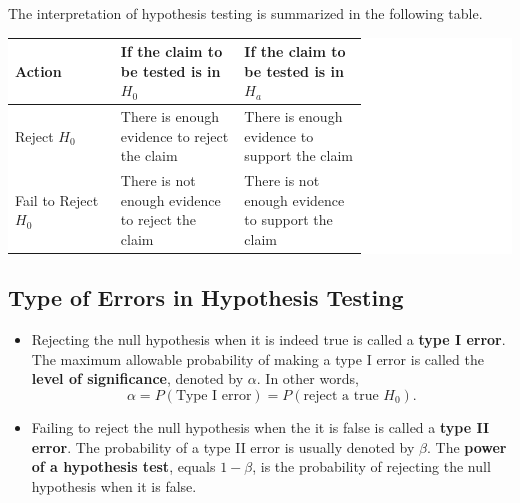 The interpretation of hypothesis testing is summarized in the following
table.

\begin{fullwidth}
  \colorbox{white}{
\parbox{\linewidth}{\centering
\begin{tabular}{l|p{0.35\linewidth}p{0.35\linewidth}}
  Action & If the claim to be tested is in \(H_0\) & If the claim to be tested is in \(H_a\) \\
  \midrule
  Reject \(H_0\) & There is enough evidence to reject the claim
  & There is enough evidence to support the claim \\
  Fail to Reject \(H_0\) & There is not enough evidence to reject the claim & There is not enough evidence to support the claim
\end{tabular}
}
  }
\end{fullwidth}

\hypertarget{type-of-errors-in-hypothesis-testing}{%
\subsection{Type of Errors in Hypothesis
Testing}\label{type-of-errors-in-hypothesis-testing}}

\begin{itemize}
\item
  Rejecting the null hypothesis when it is indeed true is called a
  \textbf{type I error}. The maximum allowable probability of making a
  type I error is called the \textbf{level of significance}, denoted by
  \(\alpha\). In other words,
  \[\alpha=P(\text{Type I error})= P(\text{reject a true }H_0).\]
\item
  Failing to reject the null hypothesis when the it is false is called a
  \textbf{type II error}. The probability of a type II error is usually
  denoted by \(\beta\). The \textbf{power of a hypothesis test}, equals
  \(1-\beta\), is the probability of rejecting the null hypothesis when
  it is false.
\end{itemize}

